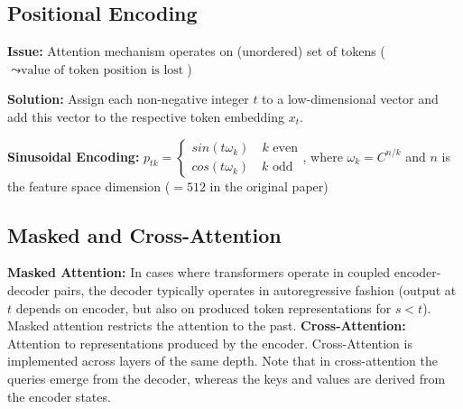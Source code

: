 \subsection{Positional Encoding}
\textbf{Issue:} Attention mechanism operates on (unordered) set of tokens ($\leadsto \text{value of token position is lost}$)


\textbf{Solution:} Assign each non-negative integer $t$ to a low-dimensional vector and add this vector to the respective token embedding $x_t$. 


\textbf{Sinusoidal Encoding:} $p_{tk} = \begin{cases}
    sin(t\omega_k) \quad k \text{ even}\\
    cos(t\omega_k) \quad k \text{ odd}
\end{cases}$, where $\omega_k = C^{n/k}$ and $n$ is the feature space dimension ($=512$ in the original paper)


\subsection{Masked and Cross-Attention}
\textbf{Masked Attention:} In cases where transformers operate in coupled encoder-decoder pairs, the decoder typically operates in autoregressive fashion (output at $t$ depends on encoder, but also on produced token representations for $s < t$). Masked attention restricts the attention to the past. 
\textbf{Cross-Attention: } Attention to representations produced by the encoder. Cross-Attention is implemented across layers of the same depth. Note that in cross-attention the queries emerge from the decoder, whereas the keys and values are derived from the encoder states. 

